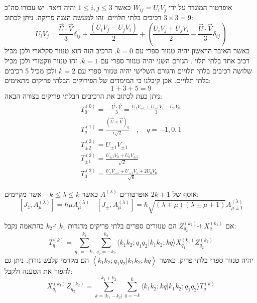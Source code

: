\documentclass{tstextbook}
\begin{document}
\begin{example}
אופרטור המוגדר על ידי \(W_{ij}=U_{i}V_{j}\) כאשר \(1\leq i,j\leq 3\) יהיה דיאד. יש עבורו סה"כ \(3\times 3 = 9\) רכיבים בלתי תלויים. זהו למעשה הצגה פריקה. ניתן לכתוב:
$$U_{i}V_{j}={\frac{\vec{U}\cdot\vec{V}}{3}}\delta_{i j}+{\frac{(U_{i}V_{j}-U_{j}V_{i})}{2}}+\left({\frac{U_{i}V_{j}+U_{j}V_{i}}{2}}-{\frac{\vec{U}\cdot\vec{V}}{3}}\delta_{i j}\right)$$
כאשר האיבר הראשון יהיה טנזור ספרי עם \(k=0\). הרכיב הזה הוא טנזור סקלארי ולכן מכיל רכיב אחד בלתי תלוי . הגורם השני יהיה טנזור ספרי עם \(k=1\). זהו טנזור ווקטורי ולכן מכיל שלושה רכיבים בלתי תלויים והגורם השלישי יהיה טנזור ספרי עם \(k=2\) ולכן מכיל 5 רכיבים בלתי תלויים. אכן קיבלנו כי המימדים של הפירוקים הבלתי פריקים מתאימים:
$$1+3+5=9$$
ניתן כעת לכתוב את הרכיבים הבלתי פריקים בצורה הבאה:
\begin{gather*}T_{0}^{(0)}=-\frac{\vec{U}\cdot\vec{V}}{3}=\frac{U_{1}V_{-1}+U_{-1}V_{1}-U_{0}V_{0}}{3}\\ T_{q}^{(1)}=\frac{\left( \vec{U}\times\vec{V} \right)_{q}}{i\sqrt{2}}\quad,\quad q=-1,0,1\\ T_{\pm2}^{(2)}=U_{\pm1}V_{\pm1}\\ T_{\pm1}^{(2)}=\frac{U_{\pm1}V_{0}+U_{0}V_{\pm1}}{\sqrt{2}}\\ T_{0}^{(2)}=\frac{U_{1}V_{-1}+U_{-1}V_{1}+2U_{0}V_{0}}{\sqrt{6}} 
\end{gather*}

\end{example}
\begin{proposition}
אוסף של \(2k+1\) אופרטורים \(A^{\left( \lambda \right)}\) כאשר \(-k\leq \lambda \leq k\) אשר מקיימים:
$$\left[J_{z},A_{\mu}^{(\lambda)}\right]=\hbar\mu A_{\mu}^{(\lambda)}\quad\left[J_{\pm},A_{\mu}^{(\lambda)}\right]=\hbar\sqrt{\left(\lambda\mp\mu\right)\left(\lambda\pm\mu+1\right)}A_{\mu\pm1}^{(\lambda)}$$

\end{proposition}
\begin{proposition}
אם \(X_{q}^{(k_{1})}\) ו-\(Z_{q_{2}}^{(k_{2})}\) הם טנזורים ספרים בלתי פריקים מדגרות \(k_{1}\) ו-\(k_{2}\) בהתאמה נקבל:
$$T_{q}^{(k)}=\sum_{q_{1}=-k_{1}}^{k_{1}}\sum_{q_{2}=-k_{2}}^{k_{2}}\langle k_{1}k_{2};q_{1}q_{2}|k_{1}k_{2};k q\rangle X_{q_{1}}^{(k_{1})}Z_{q_{2}}^{(k_{2})}$$
יהיה טנזור ספרי בלתי פריק. כאשר \(\left\langle  k_{1}k_{2};q_{1}q_{2}|k_{1}k_{2};kq  \right\rangle\) הם מקדמי קלבש גורדן. ניתן גם להפוך את הטענה ולקבל:
$$X_{q_{1}}^{(k_{1})}Z_{q_{2}}^{(k_{2})}=\sum_{k=|k_{1}-k_{2}|}^{k_{1}+k_{2}}\sum_{q=-k}^{k}\langle k_{1}k_{2};k q|k_{1}k_{2};q_{1}q_{2}\rangle T_{q}^{(k)}$$

\end{proposition}
\end{document}
